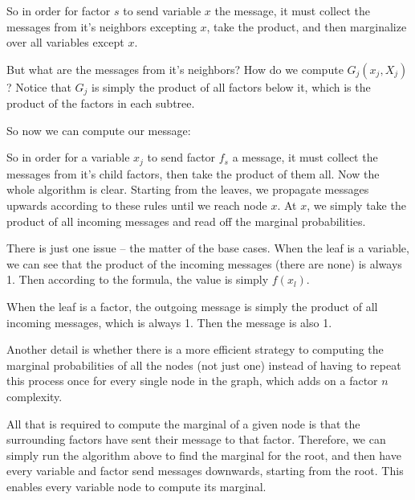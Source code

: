 \documentclass[12pt]{article}
\begin{document}
So in order for factor $s$ to send variable $x$ the message, it must collect the messages from it's neighbors excepting $x$, take the product, and then marginalize over all variables except $x$.

But what are the messages from it's neighbors? How do we compute $G_j(x_j, X_j)$? Notice that $G_j$ is simply the product of all factors below it, which is the product of the factors in each subtree.


So now we can compute our message: 


So in order for a variable $x_j$ to send factor $f_s$ a message, it must collect the messages from it's child factors, then take the product of them all. Now the whole algorithm is clear. Starting from the leaves, we propagate messages upwards according to these rules until we reach node $x$. At $x$, we simply take the product of all incoming messages and read off the marginal probabilities.

There is just one issue -- the matter of the base cases. When the leaf is a variable, we can see that the product of the incoming messages (there are none) is always 1. Then according to the formula, the value is simply $f(x_l)$.

When the leaf is a factor, the outgoing message is simply the product of all incoming messages, which is always 1. Then the message is also 1.

Another detail is whether there is a more efficient strategy to computing the marginal probabilities of all the nodes (not just one) instead of having to repeat this process once for every single node in the graph, which adds on a factor $n$ complexity.

All that is required to compute the marginal of a given node is that the surrounding factors have sent their message to that factor. Therefore, we can simply run the algorithm above to find the marginal for the root, and then have every variable and factor send messages downwards, starting from the root. This enables every variable node to compute its marginal.
\end{document}
